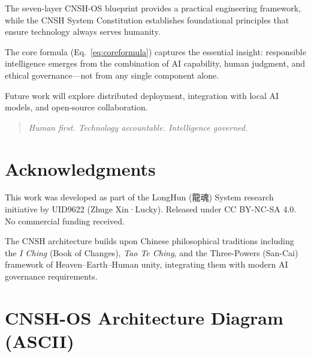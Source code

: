 \documentclass[conference]{IEEEtran}
\begin{document}
The seven-layer CNSH-OS blueprint provides a practical
engineering framework, while the CNSH System Constitution
establishes foundational principles that ensure technology
always serves humanity.

The core formula (Eq.~\ref{eq:coreformula}) captures the
essential insight: responsible intelligence emerges from the
combination of AI capability, human judgment, and ethical
governance---not from any single component alone.

Future work will explore distributed deployment, integration
with local AI models, and open-source collaboration.

\begin{quote}
\itshape
Human first. Technology accountable. Intelligence governed.
\end{quote}

\section*{Acknowledgments}

This work was developed as part of the LongHun (龍魂) System
research initiative by UID9622 (Zhuge Xin·Lucky).
Released under CC BY-NC-SA 4.0.
No commercial funding received.

The CNSH architecture builds upon Chinese philosophical
traditions including the \emph{I Ching} (Book of Changes),
\emph{Tao Te Ching}, and the Three-Powers (San-Cai)
framework of Heaven--Earth--Human unity,
integrating them with modern AI governance requirements.

\appendix

\section{CNSH-OS Architecture Diagram (ASCII)}
\end{document}
